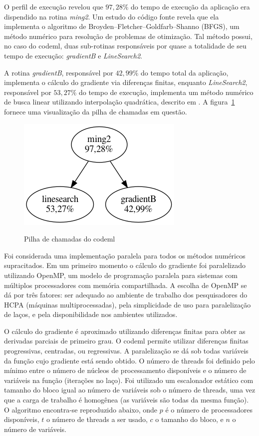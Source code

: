 \documentclass[cic,tc]{iiufrgs}
\begin{document}
O perfil de execução revelou que $97,28\%$ do tempo de execução da aplicação
era dispendido na rotina \textit{ming2}. Um estudo do código fonte revela que
ela implementa o algoritmo de Broyden–Fletcher–Goldfarb–Shanno (BFGS), um
método numérico para resolução de problemas de otimização. Tal método possui,
no caso do codeml, duas sub-rotinas responsáveis por quase a totalidade de seu
tempo de execução: \textit{gradientB} e \textit{LineSearch2}.

A rotina \textit{gradientB}, responsável por $42,99\%$ do tempo total da
aplicação, implementa o cálculo do gradiente via diferenças finitas, enquanto
\textit{LineSearch2}, responsável por $53,27\%$ do tempo de execução,
implementa um método numérico de busca linear utilizando interpolação
quadrática, descrito em \cite{wolfe1978numerical}. A
figura~\ref{fig:kcachegrind} fornece uma visualização da pilha de chamadas em
questão.

\begin{figure} \caption{Pilha de chamadas do codeml} \begin{center}
\includegraphics[width=0.3\linewidth]{img/kcachegrind.png} \end{center}
 \label{fig:kcachegrind} \end{figure}

Foi considerada uma implementação paralela para todos os métodos numéricos
supracitados. Em um primeiro momento o cálculo do gradiente foi paralelizado
utilizando OpenMP, um modelo de programação paralela para sistemas com
múltiplos processadores com memória compartilhada.\cite{chandra2001parallel} A
escolha de OpenMP se dá por três fatores: ser adequado ao ambiente de trabalho
dos pesquisadores do HCPA (máquinas multiprocessadas), pela simplicidade de uso
para paralelização de laços, e pela disponibilidade nos ambientes utilizados.

O cálculo do gradiente é aproximado utilizando diferenças finitas para obter as
derivadas parciais de primeiro grau. O codeml permite utilizar diferenças
finitas progressivas, centradas, ou regressivas. A paralelização se dá sob
todas variáveis da função cujo gradiente está sendo obtido. O número de threads
foi definido pelo mínimo entre o número de núcleos de processamento disponíveis
e o número de variáveis na função (iterações no laço). Foi utilizado um
escalonador estático com tamanho do bloco igual ao número de variáveis sob o
número de threads, uma vez que a carga de trabalho é homogênea (as variáveis
são todas da mesma função). O algoritmo encontra-se reproduzido abaixo, onde
$p$ é o número de processadores disponíveis, $t$ o número de threads a ser
usado, $c$ o tamanho do bloco, e $n$ o número de variáveis.
\end{document}
